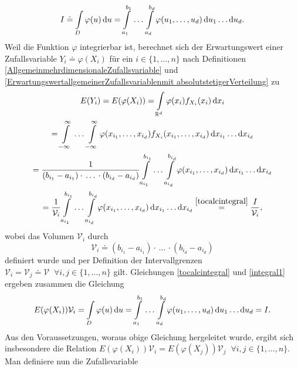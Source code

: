 \documentclass[a4paper,12pt]{article}
\begin{document}
\begin{equation}
I \doteq \int\displaylimits_{D} \varphi(u) \, \mathrm{d}u = \int\displaylimits_{a_1}^{b_1} \,\dots \, \int\displaylimits_{a_d}^{b_d} \varphi(u_1,\dots,u_d) \,\mathrm{d}u_1\dots \mathrm{d}u_d.
\end{equation} Weil die Funktion $\varphi$ integrierbar ist, berechnet sich der Erwartungswert einer Zufallsvariable $Y_i \doteq \varphi(X_i)$ für ein $i \in \{1,\dots,n\}$ nach Definitionen \ref{AllgemeinmehrdimensionaleZufallsvariable} und \ref{ErwartungswertallgemeinerZufallsvariablenmit absolutstetigerVerteilung} zu \begin{gather}\label{integral1}
E(Y_i)=E(\varphi(X_i)) = \int\displaylimits_{\mathbb{R}^d} \varphi(x_i)f_{X_i}(x_i) \,\mathrm{d}x_i  \nonumber \\ = \int\displaylimits_{-\infty}^{\infty} \, \dots \, \int\displaylimits_{-\infty}^{\infty} \varphi(x_{i_1},\dots,x_{i_d}) f_{X_i}(x_{i_1},\dots,x_{i_d}) \,\mathrm{d}x_{i_1}\dots \mathrm{d}x_{i_d} \nonumber \\  =  \frac{1}{(b_{i_1}-a_{i_1})\cdot\,\dots\,\cdot(b_{i_d}-a_{i_d})} \int\displaylimits_{a_{i_1}}^{b_{i_1}}\,\dots\,\int\displaylimits_{a_{i_d}}^{b_{i_d}} \varphi(x_{i_1},\dots,x_{i_d}) \,\mathrm{d}x_{i_1}\dots \mathrm{d}x_{i_d}\nonumber \\ = \frac{1}{\mathcal{V}_i}\int\displaylimits_{a_{i_1}}^{b_{i_1}}\,\dots\,\int\displaylimits_{a_{i_d}}^{b_{i_d}} \varphi(x_{i_1},\dots,x_{i_d}) \,\mathrm{d}x_{i_1}\dots \mathrm{d}x_{i_d} \overset{\eqref{tocalcintegral}}{=} \frac{I}{\mathcal{V}_i},
\end{gather} wobei das Volumen $\mathcal{V}_i$ durch \begin{equation}
\mathcal{V}_i \doteq (b_{i_1}-a_{i_1})\cdot \,\dots \,\cdot (b_{i_d}-a_{i_d})
\end{equation} definiert wurde und per Definition der Intervallgrenzen $\mathcal{V}_i = \mathcal{V}_j \doteq \mathcal{V} \;\; \forall i,j \in \{1,\dots,n\}$ gilt. Gleichungen \eqref{tocalcintegral} und \eqref{integral1} ergeben zusammen die Gleichung \begin{equation}
E(\varphi(X_i))\mathcal{V}_i = \int\displaylimits_{D} \varphi(u) \, \mathrm{d}u = \int\displaylimits_{a_1}^{b_1} \,\dots \, \int\displaylimits_{a_d}^{b_d} \varphi(u_1,\dots,u_d) \,\mathrm{d}u_1\dots \mathrm{d}u_d = I.
\end{equation} Aus den Voraussetzungen, woraus obige Gleichung hergeleitet wurde, ergibt sich insbesondere die Relation $E(\varphi(X_i))\mathcal{V}_i = E(\varphi(X_j))\mathcal{V}_j \;\; \forall i,j \in \{1,\dots,n\}.$ Man definiere nun die Zufallsvariable \begin{equation}\label{defzvintegral}

\end{equation}
\end{document}

